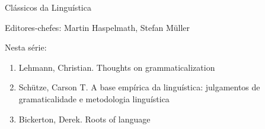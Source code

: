 {\large Clássicos da Linguística}

\bigskip

Editores-chefes: Martin Haspelmath, Stefan Müller

\bigskip

Nesta série:

\begin{enumerate}
\item Lehmann, Christian. Thoughts on grammaticalization
\item Schütze, Carson T. A base empírica da linguística: julgamentos de gramaticalidade e metodologia linguística
\item Bickerton, Derek. Roots of language
\end{enumerate}


\vfill


